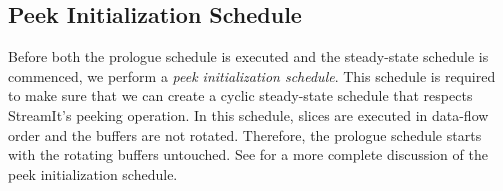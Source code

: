\subsection{Peek Initialization Schedule}
Before both the prologue schedule is executed and the steady-state
schedule is commenced, we perform a {\it peek initialization
schedule}.  This schedule is required to make sure that we can create
a cyclic steady-state schedule that respects StreamIt's peeking
operation.  In this schedule, slices are executed in data-flow order
and the buffers are not rotated.  Therefore, the prologue schedule
starts with the rotating buffers untouched.  See
\cite{streamitcc} for a more complete discussion of the peek
initialization schedule.


